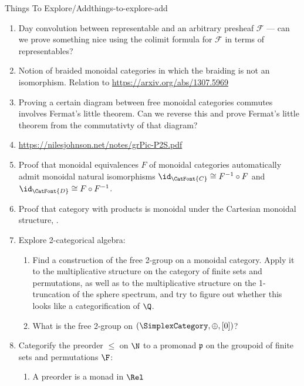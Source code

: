 \begin{remark}{Things To Explore/Add}{things-to-explore-add}
\begin{enumerate}
            \begin{enumerate}
                \item Picard group for Day convolution. A special case is one of Kaplansky's conjectures, \url{https://en.wikipedia.org/wiki/Kaplansky\%27s_conjectures}, about units of group rings
            \end{enumerate}
        \item Day convolution between representable and an arbitrary presheaf $\mathcal{F}$ --- can we prove something nice using the colimit formula for $\mathcal{F}$ in terms of representables?
        \item Notion of braided monoidal categories in which the braiding is not an isomorphism. Relation to \url{https://arxiv.org/abs/1307.5969}
        \item Proving a certain diagram between free monoidal categories commutes involves Fermat's little theorem. Can we reverse this and prove Fermat's little theorem from the commutativty of that diagram?
        \item \url{https://nilesjohnson.net/notes/grPic-P2S.pdf}
        \item Proof that monoidal equivalences $F$ of monoidal categories automatically admit monoidal natural isomorphisms $\id_{\CatFont{C}}\cong F^{-1}\circ F$ and $\id_{\CatFont{D}}\cong F\circ F^{-1}$.
        \item Proof that category with products is monoidal under the Cartesian monoidal structure, \cite{MO382264}.
        \item Explore 2-categorical algebra:
            \begin{enumerate}
                \item Find a construction of the free 2-group on a monoidal category. Apply it to the multiplicative structure on the category of finite sets and permutations, as well as to the multiplicative structure on the 1-truncation of the sphere spectrum, and try to figure out whether this looks like a categorification of $\Q$.
                \item What is the free 2-group on $(\SimplexCategory,\oplus,[0])$?
            \end{enumerate}
        \item Categorify the preorder $\leq$ on $\N$ to a promonad $\mathfrak{p}$ on the groupoid of finite sets and permutations $\F$:
            \begin{enumerate}
                \item A preorder is a monad in $\Rel$

\end{enumerate}
\end{enumerate}
\end{remark}
